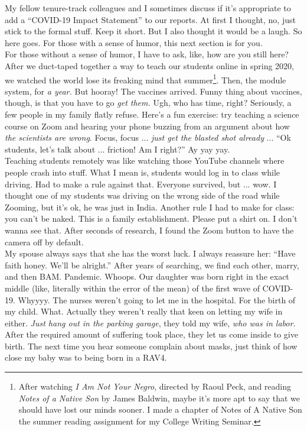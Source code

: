 \documentclass[../../main.tex]{subfiles}
\begin{document}
My fellow tenure-track colleagues and I sometimes discuss if it's appropriate to add a ``COVID-19 Impact Statement'' to our reports.  At first I thought, no, just stick to the formal stuff.  Keep it short.  But I also thought it would be a laugh.  So here goes.  For those with a sense of humor, this next section is for you.  
\\
\vspace{0.15cm}
For those without a sense of humor, I have to ask, like, how are you still here?  After we duct-taped together a way to teach our students online in spring 2020, we watched the world lose its freaking mind that summer\footnote{After watching \textit{I Am Not Your Negro}, directed by Raoul Peck, and reading \textit{Notes of a Native Son} by James Baldwin, maybe it's more apt to say that we should have lost our minds sooner. I made a chapter of Notes of A Native Son the summer reading assignment for my College Writing Seminar.}.  Then, the module system, for \textit{a year.}  But hooray!  The vaccines arrived.  Funny thing about vaccines, though, is that you have to go \textit{get them.}  Ugh, who has time, right?  Seriously, a few people in my family flatly refuse.  Here's a fun exercise: try teaching a science course on Zoom and hearing your phone buzzing from an argument about how \textit{the scientists are wrong}.  Focus, focus ... \textit{just get the blasted shot already} ... ``Ok students, let's talk about ... friction!  Am I right?''  Ay yay yay.
\\
\vspace{0.15cm}
Teaching students remotely was like watching those YouTube channels where people crash into stuff.  What I mean is, students would log in to class while driving.  Had to make a rule against that.  Everyone survived, but ... wow.  I thought one of my students was driving on the wrong side of the road while Zooming, but it's ok, he was just in India.  Another rule I had to make for class: you can't be naked.  This is a family establishment. Please put a shirt on.  I don't wanna see that.  After seconds of research, I found the Zoom button to have the camera off by default.
\\
\vspace{0.15cm}
My spouse always says that she has the worst luck.  I always reassure her: ``Have faith honey.  We'll be alright.''  After years of searching, we find each other, marry, and then BAM.  Pandemic.  Whoops.  Our daughter was born right in the exact middle (like, literally within the error of the mean) of the first wave of COVID-19.  Whyyyy.  The nurses weren't going to let me in the hospital.  For the birth of my child.  What.  Actually they weren't really that keen on letting my wife in either.  \textit{Just hang out in the parking garage}, they told my wife, \textit{who was in labor.}  After the required amount of suffering took place, they let us come inside to give birth.  The next time you hear someone complain about masks, just think of how close my baby was to being born in a RAV4.
\end{document}
